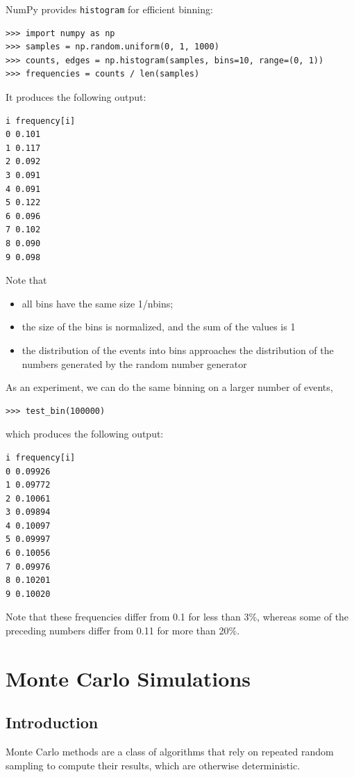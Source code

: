 \documentclass[justified, sixbynine]{tufte-book}
\def\ft{\small\tt}
\theoremstyle{plain}%
\newtheorem * {corollary}{Corollary}
\theoremstyle{definition}
\theoremstyle{remark}
\newtheorem * {remark}{Remark}
\newtheorem * {note}{Note}
\begin{document}
\begin{fullwidth}
NumPy provides {\ft histogram} for efficient binning:

\begin{lstlisting}
>>> import numpy as np
>>> samples = np.random.uniform(0, 1, 1000)
>>> counts, edges = np.histogram(samples, bins=10, range=(0, 1))
>>> frequencies = counts / len(samples)
\end{lstlisting}

It produces the following output:
\begin{lstlisting}
i frequency[i]
0 0.101
1 0.117
2 0.092
3 0.091
4 0.091
5 0.122
6 0.096
7 0.102
8 0.090
9 0.098
\end{lstlisting}

Note that

\begin{itemize}
\item  all bins have the same size 1/nbins;

\item  the size of the bins is normalized, and the sum of the values is 1

\item  the distribution of the events into bins approaches the distribution
of the numbers generated by the random number generator
\end{itemize}

As an experiment, we can do the same binning on a larger number of events, 
\begin{lstlisting}
>>> test_bin(100000)
\end{lstlisting}

which produces the following output:
\begin{lstlisting}
i frequency[i]
0 0.09926
1 0.09772
2 0.10061
3 0.09894
4 0.10097
5 0.09997
6 0.10056
7 0.09976
8 0.10201
9 0.10020
\end{lstlisting}

Note that these frequencies differ from 0.1 for less than 3\%, whereas some of
the preceding numbers differ from 0.11 for more than 20\%.

\chapter{Monte Carlo Simulations}

\goodbreak\section{Introduction}

Monte Carlo methods are a class of algorithms that rely on repeated random sampling to compute their results, which are otherwise deterministic.


\end{fullwidth}
\end{document}
